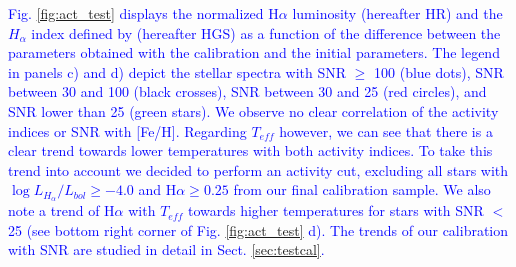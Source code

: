 \documentclass{aa}
\begin{document}
\textcolor{blue}{Fig. \ref{fig:act_test} displays the normalized H$\alpha$ luminosity (hereafter HR) and the $H_{\alpha}$ index defined by \citet{Gomes_da_Silva-2011} (hereafter HGS) as a function of the difference between the parameters obtained with the calibration and the initial parameters. The legend in panels c) and d) depict the stellar spectra with SNR $\geq$ 100 (blue dots), SNR between 30 and 100 (black crosses), SNR between 30 and 25 (red circles), and SNR lower than 25 (green stars). We observe no clear correlation of the activity indices or SNR with [Fe/H]. Regarding $T_{eff}$ however, we can see that there is a clear trend towards lower temperatures with both activity indices. To take this trend into account we decided to perform an activity cut, excluding all stars with $\log{L_{H_{\alpha}}/L_{bol}} \geq -4.0 $ and H$\alpha \geq 0.25$ from our final calibration sample. We also note a trend of H$\alpha$ with $T_{eff}$ towards higher temperatures for stars with SNR $<$ 25 (see bottom right corner of Fig. \ref{fig:act_test} d). The trends of our calibration with SNR are studied in detail in Sect. \ref{sec:testcal}. 
}
\end{document}
